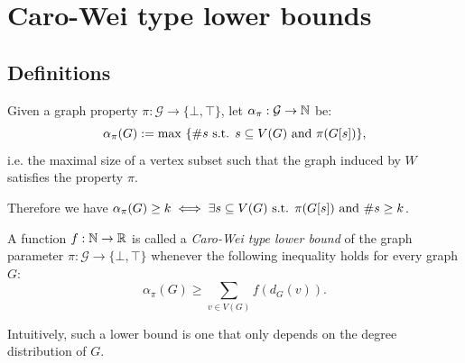 %

\chapter{Caro-Wei type lower bounds}

\section{Definitions}

Given a graph property $\pi : \mathcal G \to \{\bot, \top\}$, let $\alpha_\pi : \mathcal G \to \mathbb N$ be:
\[\alpha_\pi(G) := \max\ \{\#s \text{ s.t. } s \subseteq V(G) \text{ and } \pi(G[s])\},\]
i.e. the maximal size of a vertex subset such that the graph induced by $W$ satisfies the property $\pi$.

Therefore we have $\alpha_\pi(G) \ge k \iff \exists s \subseteq V(G) \text{ s.t. } \pi(G[s]) \text{ and } \#s \ge k$.

\begin{definition}\label{def:cwtype-lb}
\leanok
A function $f : \mathbb N \to \mathbb R$ is called a \emph{Caro-Wei type lower bound} of the graph parameter $\pi : \mathcal G \to \{\bot, \top\}$ whenever the following inequality holds for every graph $G$:
\[\alpha_\pi(G) \ge \sum_{v \in V(G)} f(d_G(v)).\]

Intuitively, such a lower bound is one that only depends on the degree distribution of $G$.
\end{definition}
